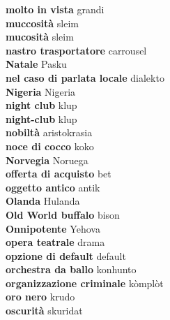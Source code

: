 \textbf{ molto in vista  } grandi \\
\textbf{ muccosità  } sleim \\
\textbf{ mucosità  } sleim \\
\textbf{ nastro trasportatore  } carrousel \\
\textbf{ Natale  } Pasku \\
\textbf{ nel caso di parlata locale  } dialekto \\
\textbf{ Nigeria  } Nigeria \\
\textbf{ night club  } klup \\
\textbf{ night-club  } klup \\
\textbf{ nobiltà  } aristokrasia \\
\textbf{ noce di cocco  } koko \\
\textbf{ Norvegia  } Noruega \\
\textbf{ offerta di acquisto  } bet \\
\textbf{ oggetto antico  } antik \\
\textbf{ Olanda  } Hulanda \\
\textbf{ Old World buffalo  } bison \\
\textbf{ Onnipotente  } Yehova \\
\textbf{ opera teatrale  } drama \\
\textbf{ opzione di default  } default \\
\textbf{ orchestra da ballo  } konhunto \\
\textbf{ organizzazione criminale  } kòmplòt \\
\textbf{ oro nero  } krudo \\
\textbf{ oscurità  } skuridat \\
